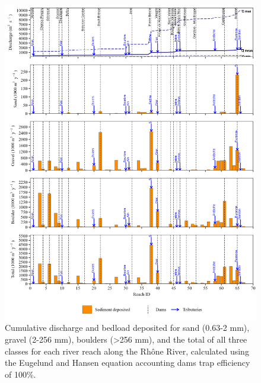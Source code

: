 \documentclass[
]{book}
\begin{document}
\begin{figure}
\includegraphics[width=26.24in]{img/res_cascade/res_E3_eE&H/plots_dep-silt/dep_res_sum_hy_E3_eE&H} \caption{Cumulative discharge and bedload deposited for sand (0.63-2 mm), gravel (2-256 mm), boulders (>256 mm), and the total of all three classes for each river reach along the Rhône River, calculated using the Eugelund and Hansen equation accounting dams trap efficiency of 100\%.}\label{fig:DepE3eE}
\end{figure}
\end{document}

